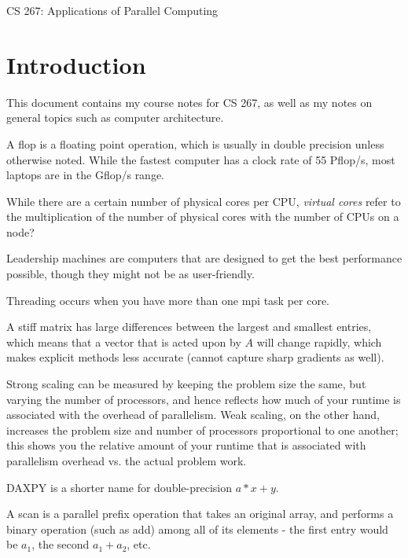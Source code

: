\documentclass[10pt]{article}
\begin{document}
\begin{centering}
\Large CS 267: Applications of Parallel Computing\\
\end{centering}

\tableofcontents
\clearpage

\section{Introduction}
\begin{flushleft}\justify

This document contains my course notes for CS 267, as well as my notes on general topics such as computer architecture.






A flop is a floating point operation, which is usually in double precision unless otherwise noted. While the fastest computer has a clock rate of 55 Pflop/s, most laptops are in the Gflop/s range. 

While there are a certain number of physical cores per CPU, \textit{virtual cores} refer to the multiplication of the number of physical cores with the number of CPUs on a node? 

Leadership machines are computers that are designed to get the best performance possible, though they might not be as user-friendly.

Threading occurs when you have more than one \gls{mpi} task per core. 

A stiff matrix has large differences between the largest and smallest entries, which means that a vector that is acted upon by \(A\) will change rapidly, which makes explicit methods less accurate (cannot capture sharp gradients as well). 

Strong scaling can be measured by keeping the problem size the same, but varying the number of processors, and hence reflects how much of your runtime is associated with the overhead of parallelism. Weak scaling, on the other hand, increases the problem size and number of processors proportional to one another; this shows you the relative amount of your runtime that is associated with parallelism overhead vs. the actual problem work.

DAXPY is a shorter name for double-precision \(a*x+y\). 

A scan is a parallel prefix operation that takes an original array, and performs a binary operation (such as add) among all of its elements - the first entry would be \(a_1\), the second \(a_1+a_2\), etc. 


\end{flushleft}
\end{document}
